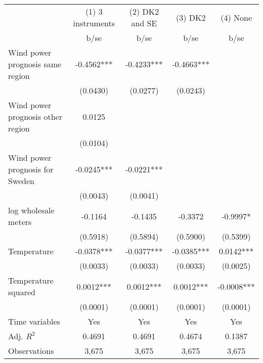 \begin{tabular}{lcccc}\toprule
                    &(1) 3 instruments   &(2) DK2 and SE   &     (3) DK2   &    (4) None   \\
                    &        b/se   &        b/se   &        b/se   &        b/se   \\
\midrule
Wind power prognosis same region&     -0.4562***&     -0.4233***&     -0.4663***&               \\
                    &    (0.0430)   &    (0.0277)   &    (0.0243)   &               \\
Wind power prognosis other region&      0.0125   &               &               &               \\
                    &    (0.0104)   &               &               &               \\
Wind power prognosis for Sweden&     -0.0245***&     -0.0221***&               &               \\
                    &    (0.0043)   &    (0.0041)   &               &               \\
log wholesale meters&     -0.1164   &     -0.1435   &     -0.3372   &     -0.9997*  \\
                    &    (0.5918)   &    (0.5894)   &    (0.5900)   &    (0.5399)   \\
Temperature         &     -0.0378***&     -0.0377***&     -0.0385***&      0.0142***\\
                    &    (0.0033)   &    (0.0033)   &    (0.0033)   &    (0.0025)   \\
Temperature squared &      0.0012***&      0.0012***&      0.0012***&     -0.0008***\\
                    &    (0.0001)   &    (0.0001)   &    (0.0001)   &    (0.0001)   \\
Time variables      &         Yes   &         Yes   &         Yes   &         Yes   \\
\midrule
Adj. \(R^2\)        &      0.4691   &      0.4691   &      0.4674   &      0.1387   \\
Observations        &       3,675   &       3,675   &       3,675   &       3,675   \\
\bottomrule\end{tabular}
